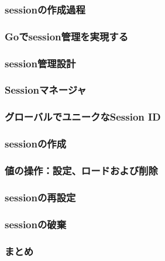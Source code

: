 
\subsubsection{sessionの作成過程}

\subsubsection{Goでsession管理を実現する}

\subsubsection{session管理設計}

\subsubsection{Sessionマネージャ}

\subsubsection{グローバルでユニークなSession ID}

\subsubsection{sessionの作成}

\subsubsection{値の操作：設定、ロードおよび削除}

\subsubsection{sessionの再設定}

\subsubsection{sessionの破棄}

\subsubsection{まとめ}

